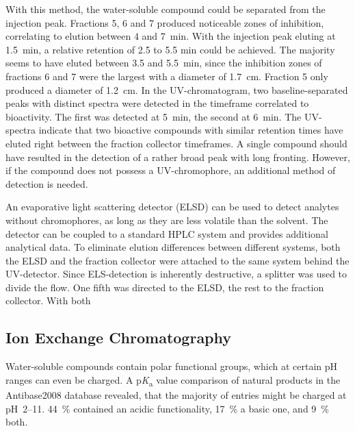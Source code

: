 	    With this method, the water-soluble compound could be separated from the injection peak.
	    Fractions 5, 6 and 7 produced noticeable zones of inhibition, correlating to elution between 4 and 7~min.
	    With the injection peak eluting at 1.5~min, a relative retention of 2.5 to 5.5 min could be achieved.
	    The majority seems to have eluted between 3.5 and 5.5~min, since the inhibition zones of fractions 6 and 7 were the largest with a diameter of \SI{1.7}{\centi\meter}.
	    Fraction 5 only produced a diameter of \SI{1.2}{\centi\meter}.
	    In the UV-chromatogram, two baseline-separated peaks with distinct spectra were detected in the timeframe correlated to bioactivity.
	    The first was detected at 5~min, the second at 6~min. The UV-spectra  indicate that two bioactive compounds with similar retention times have eluted right between the fraction collector timeframes.
	    A single compound should have resulted in the detection of a rather broad peak with long fronting.
	    However, if the compound does not possess a UV-chromophore, an additional method of detection is needed.

		An evaporative light scattering detector (ELSD) can be used to detect analytes without chromophores, as long as they are less volatile than the solvent.\autocite{Mathews2004,Righezza1988,Mourey1984,Charlesworth1978}
		The detector can be coupled to a standard HPLC system and provides additional analytical data.
		To eliminate elution differences between different systems, both the ELSD and the fraction collector were attached to the same system behind the UV-detector.
		Since ELS-detection is inherently destructive, a splitter was used to divide the flow. One fifth was directed to the ELSD, the rest to the fraction collector.
		With both 
	    
	    

    \subsection{Ion Exchange Chromatography} %
    \label{sub:results_ion_exchange_chromatography}

	Water-soluble compounds contain polar functional groups, which at certain pH ranges can even be charged.
	A p\textit{K}\textsubscript{a} value comparison of natural products in the Antibase2008 database revealed, that the majority of entries might be charged at pH~2--11.\autocite{Mansson2010}
	44~\% contained an acidic functionality, 17~\% a basic one, and 9~\% both.

